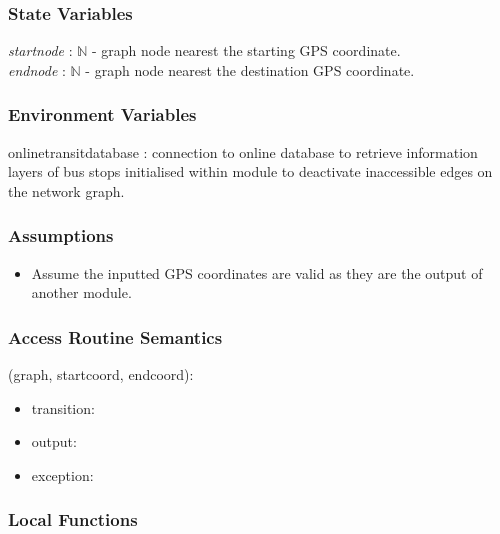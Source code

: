 \documentclass[12pt, titlepage]{article}
\begin{document}
\subsubsection{State Variables}

\emph{startnode} : $\mathbb{N}$ - graph node nearest the starting GPS coordinate.\\
\emph{endnode} : $\mathbb{N}$ - graph node nearest the destination GPS coordinate.

\subsubsection{Environment Variables}

onlinetransitdatabase : connection to online database to retrieve information layers of bus stops initialised within module to deactivate inaccessible edges on the network graph.

\subsubsection{Assumptions}

\begin{itemize}
    \item Assume the inputted GPS coordinates are valid as they are the output of another module.
\end{itemize}

\subsubsection{Access Routine Semantics}

\noindent {}(graph, startcoord, endcoord):
\begin{itemize}
\item transition:  
\item output:  
\item exception:  
\end{itemize}

\subsubsection{Local Functions}
\end{document}
